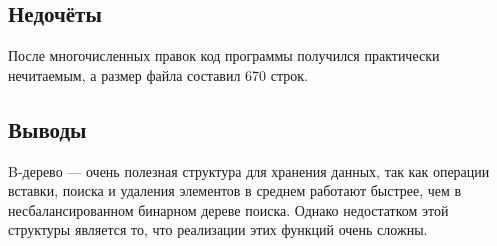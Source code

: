 \documentclass[12pt]{article}
\begin{document}
\subsection*{Недочёты}

После многочисленных правок код программы получился практически нечитаемым, а размер файла 
составил 
670
строк.

\subsection*{Выводы}

B-дерево — очень полезная структура для хранения данных, так как операции вставки, поиска и 
удаления элементов в среднем работают быстрее, чем в несбалансированном бинарном дереве 
поиска. Однако недостатком этой структуры является то, что реализации этих функций очень сложны.
\end{document}
